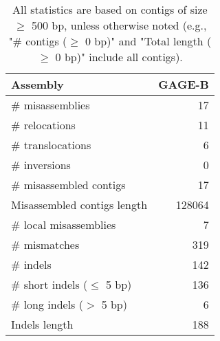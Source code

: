 \documentclass[12pt,a4paper]{article}
\begin{document}
\begin{table}[ht]
\begin{center}
\caption{All statistics are based on contigs of size $\geq$ 500 bp, unless otherwise noted (e.g., "\# contigs ($\geq$ 0 bp)" and "Total length ($\geq$ 0 bp)" include all contigs).}
\begin{tabular}{|l*{1}{|r}|}
\hline
Assembly & GAGE-B \\ \hline
\# misassemblies & 17 \\ \hline
\hspace{5mm}\# relocations & 11 \\ \hline
\hspace{5mm}\# translocations & 6 \\ \hline
\hspace{5mm}\# inversions & 0 \\ \hline
\# misassembled contigs & 17 \\ \hline
Misassembled contigs length & 128064 \\ \hline
\# local misassemblies & 7 \\ \hline
\# mismatches & 319 \\ \hline
\# indels & 142 \\ \hline
\hspace{5mm}\# short indels ($\leq$ 5 bp) & 136 \\ \hline
\hspace{5mm}\# long indels ($>$ 5 bp) & 6 \\ \hline
Indels length & 188 \\ \hline
\end{tabular}
\end{center}
\end{table}
\end{document}

